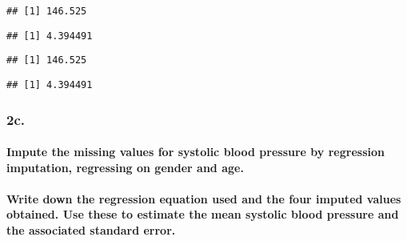 \documentclass[
]{article}
\newenvironment{Shaded}{\begin{snugshade}}{\end{snugshade}}
\newcommand{\CommentTok}[1]{\textcolor[rgb]{0.56,0.35,0.01}{\textit{#1}}}
\newcommand{\DataTypeTok}[1]{\textcolor[rgb]{0.13,0.29,0.53}{#1}}
\newcommand{\KeywordTok}[1]{\textcolor[rgb]{0.13,0.29,0.53}{\textbf{#1}}}
\newcommand{\NormalTok}[1]{#1}
\newcommand{\OperatorTok}[1]{\textcolor[rgb]{0.81,0.36,0.00}{\textbf{#1}}}
\newcommand{\OtherTok}[1]{\textcolor[rgb]{0.56,0.35,0.01}{#1}}
\newcommand{\StringTok}[1]{\textcolor[rgb]{0.31,0.60,0.02}{#1}}
\begin{document}
\begin{verbatim}
## [1] 146.525
\end{verbatim}

\begin{verbatim}
## [1] 4.394491
\end{verbatim}

\begin{Shaded}
\end{Shaded}

\begin{verbatim}
## [1] 146.525
\end{verbatim}

\begin{verbatim}
## [1] 4.394491
\end{verbatim}

\hypertarget{c.}{%
\subsubsection{2c.}\label{c.}}

\hypertarget{impute-the-missing-values-for-systolic-blood-pressure-by-regression-imputation-regressing-on-gender-and-age.}{%
\paragraph{Impute the missing values for systolic blood pressure by
regression imputation, regressing on gender and
age.}\label{impute-the-missing-values-for-systolic-blood-pressure-by-regression-imputation-regressing-on-gender-and-age.}}

\hypertarget{write-down-the-regression-equation-used-and-the-four-imputed-values-obtained.-use-these-to-estimate-the-mean-systolic-blood-pressure-and-the-associated-standard-error.}{%
\paragraph{Write down the regression equation used and the four imputed
values obtained. Use these to estimate the mean systolic blood pressure
and the associated standard
error.}\label{write-down-the-regression-equation-used-and-the-four-imputed-values-obtained.-use-these-to-estimate-the-mean-systolic-blood-pressure-and-the-associated-standard-error.}}
\end{document}

